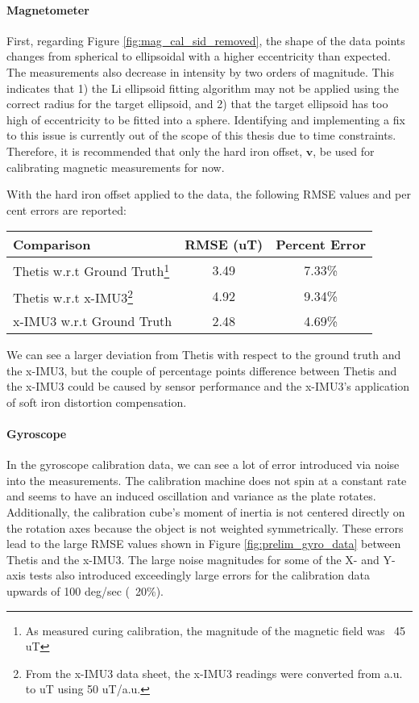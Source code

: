 \paragraph*{Magnetometer} First, regarding Figure \ref{fig:mag_cal_sid_removed}, the shape of the data points changes from spherical to ellipsoidal with a higher eccentricity than expected.
The measurements also decrease in intensity by two orders of magnitude. 
This indicates that 1) the Li ellipsoid fitting algorithm may not be applied using the correct radius for the target ellipsoid, and 2) that the target ellipsoid has too high of eccentricity to be fitted into a sphere.
Identifying and implementing a fix to this issue is currently out of the scope of this thesis due to time constraints.
Therefore, it is recommended that only the hard iron offset, $\pmb{v}$, be used for calibrating magnetic measurements for now.

With the hard iron offset applied to the data, the following RMSE values and per cent errors are reported:

\begin{table}[h!]
    \renewcommand{\arraystretch}{1.75}
    \centering
    \begin{tabular}{| m{5cm} | c | c |}
        \hline
        \textbf{Comparison} & \textbf{RMSE (uT)} & \textbf{Percent Error} \\
        \hline
        Thetis w.r.t Ground Truth\footnote{As measured curing calibration, the magnitude of the magnetic field was ~45 uT} & 3.49 & 7.33\% \\
        Thetis w.r.t x-IMU3\footnote{From the x-IMU3 data sheet, the x-IMU3 readings were converted from a.u. to uT using 50 uT/a.u.} & 4.92 & 9.34\% \\
        x-IMU3 w.r.t Ground Truth\footnotemark[\value{footnote}] & 2.48 & 4.69\% \\
        \hline
    \end{tabular}
\end{table}

We can see a larger deviation from Thetis with respect to the ground truth and the x-IMU3, but the couple of percentage points difference between Thetis and the x-IMU3 could be caused by sensor performance and the x-IMU3's application of soft iron distortion compensation.

\paragraph*{Gyroscope} In the gyroscope calibration data, we can see a lot of error introduced via noise into the measurements.
The calibration machine does not spin at a constant rate and seems to have an induced oscillation and variance as the plate rotates.
Additionally, the calibration cube's moment of inertia is not centered directly on the rotation axes because the object is not weighted symmetrically.
These errors lead to the large RMSE values shown in Figure \ref{fig:prelim_gyro_data} between Thetis and the x-IMU3.
The large noise magnitudes for some of the X- and Y-axis tests also introduced exceedingly large errors for the calibration data upwards of 100 deg/sec (~20\%).


